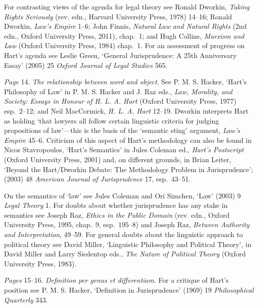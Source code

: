 For contrasting views of the agenda for legal theory see Ronald Dworkin,
\emph{Taking Rights Seriously} (rev. edn., Harvard University Press,
1978) 14--16; Ronald Dworkin, \emph{Law's Empire} 1--6; John Finnis,
\emph{Natural Law and Natural Rights} (2nd edn., Oxford University
Press, 2011), chap.~1; and Hugh Collins, \emph{Marxism and Law} (Oxford
University Press, 1984) chap.~1. For an assessment of progress on Hart's
agenda see Leslie Green, `General Jurisprudence: A 25th Anniversary
Essay' (2005) 25 \emph{Oxford Journal of Legal Studies} 565.

\emph{Page} 14. \emph{The relationship between word and object}. See P.
M. S. Hacker, `Hart's Philosophy of Law' in P. M. S. Hacker and J. Raz
eds., \emph{Law, Morality, and Society: Essays in Honour of H. L. A.
Hart} (Oxford University Press, 1977) esp.~2--12; and Neil MacCormick,
\emph{H. L. A. Hart} 12--19. Dworkin interprets Hart as holding `that
lawyers all follow certain linguistic criteria for judging propositions
of law'---this is the basis of the `semantic sting' argument,
\emph{Law's Empire} 45--6. Criticism of this aspect of Hart's
methodology can also be found in Nicos Stavropoulos, `Hart's Semantics'
in Jules Coleman ed., \emph{Hart's Postscript} (Oxford University Press,
2001) and, on different grounds, in Brian Leiter, `Beyond the
Hart/Dworkin Debate: The Methodology Problem in Jurisprudence'; (2003)
48 \emph{American Journal of Jurisprudence} 17, esp.~43--51.

On the semantics of `law' see Jules Coleman and Ori Simchen, `Law'
(2003) 9 \emph{Legal Theory} 1. For doubts about whether jurisprudence
has any stake in semantics see Joseph Raz, \emph{Ethics in the Public
Domain} (rev. edn., Oxford University Press, 1995, chap.~9, esp.~195--8)
and Joseph Raz, \emph{Between Authority and Interpretation}, 49--59. For
general doubts about the linguistic approach to political theory see
David Miller, `Linguistic Philosophy and Political Theory', in David
Miller and Larry Siedentop eds., \emph{The Nature of Political Theory}
(Oxford University Press, 1983).

\emph{Pages} 15--16. \emph{Definition per genus et differentiam}. For a
critique of Hart's position see P. M. S. Hacker, `Definition in
Jurisprudence' (1969) 19 \emph{Philosophical Quarterly} 343.

